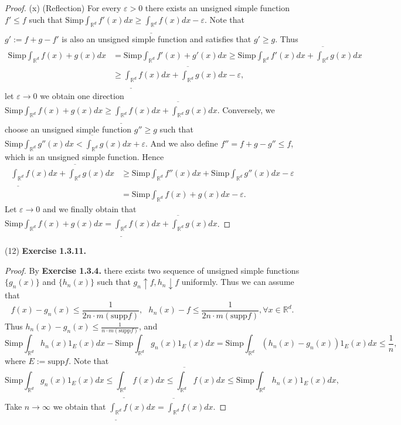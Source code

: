 \documentclass[a4paper]{article}
\begin{document}
\begin{proof}
(x) (Reflection) For every $\varepsilon > 0$ there exists an unsigned simple function $f' \leq f$ such that 
$\mathrm{Simp}\int_{\mathbb{R}^d} f'(x) dx \geq \underline{\int_{\mathbb{R}^d}}f(x) dx - \varepsilon$. Note that 
$g' := f + g -  f'$ is also an unsigned simple function and satisfies that $g' \geq g$. Thus \begin{align*}
\mathrm{Simp}\int_{\mathbb{R}^d} f(x) + g(x) dx &= \mathrm{Simp}\int_{\mathbb{R}^d} f'(x) + g'(x) dx 
\geq \mathrm{Simp}\int_{\mathbb{R}^d} f'(x) dx + \overline{\int_{\mathbb{R}^d}} g(x) dx\\
&\geq \underline{\int_{\mathbb{R}^d}}f(x) dx + \overline{\int_{\mathbb{R}^d}} g(x) dx - \varepsilon,
\end{align*}
let $\varepsilon \to 0$ we obtain one direction $\mathrm{Simp}\int_{\mathbb{R}^d} f(x) + g(x) dx \geq \underline
{\int_{\mathbb{R}^d}}f(x) dx + \overline{\int_{\mathbb{R}^d}} g(x) dx$. Conversely, we choose an unsigned simple
function $g'' \geq g$ such that $\mathrm{Simp}\int_{\mathbb{R}^d} g''(x) dx < \overline{\int_{\mathbb{R}^d}} g(x) dx + \varepsilon$.
And we also define $f'' = f + g - g''  \leq f$, which is an unsigned simple function. Hence \begin{align*}
\underline{\int_{\mathbb{R}^d}}f(x) dx + \overline{\int_{\mathbb{R}^d}} g(x) dx &\geq 
\mathrm{Simp}\int_{\mathbb{R}^d} f''(x) dx + \mathrm{Simp}\int_{\mathbb{R}^d} g''(x) dx - \varepsilon\\
&= \mathrm{Simp}\int_{\mathbb{R}^d} f(x) + g(x) dx - \varepsilon.
\end{align*}
Let $\varepsilon \to 0$ and we finally obtain that $\mathrm{Simp}\int_{\mathbb{R}^d} f(x) + g(x) dx = 
\underline{\int_{\mathbb{R}^d}}f(x) dx + \overline{\int_{\mathbb{R}^d}} g(x) dx$.
\end{proof}

(12) {\bfseries Exercise 1.3.11.}\begin{proof}
By {\bfseries Exercise 1.3.4.} there exists two sequence of unsigned simple functions $\{g_n(x)\}$ and $\{h_n(x)\}$ such
that $g_n \uparrow f, h_n \downarrow f$ uniformly. Thus we can assume that $$
f(x) - g_n(x) \leq \frac{1}{2n\cdot m(\mathrm{supp}f)},\ \ \ h_n(x) - f \leq \frac{1}{2n\cdot m(\mathrm{supp}f)}, 
\forall x \in \mathbb{R}^d.
$$Thus $h_n(x) - g_n(x) \leq \frac{1}{n \cdot m(\mathrm{supp}f)}$, and $$
\mathrm{Simp}\int_{\mathbb{R}^d}h_n(x)1_{E}(x) dx - \mathrm{Simp}\int_{\mathbb{R}^d} g_n(x)1_{E}(x) dx =
\mathrm{Simp}\int_{\mathbb{R}^d} (h_n(x) - g_n(x))1_E(x) dx \leq \frac{1}{n},
$$where $E := \mathrm{supp}f$. Note that $$
\mathrm{Simp}\int_{\mathbb{R}^d} g_n(x)1_{E}(x) dx \leq \underline{\int_{\mathbb{R}^d}}f(x) dx \leq 
\overline{\int_{\mathbb{R}^d}}f(x) dx \leq \mathrm{Simp}\int_{\mathbb{R}^d} h_n(x)1_{E}(x) dx,
$$Take $n \to \infty$ we obtain that $\underline{\int_{\mathbb{R}^d}}f(x) dx = \overline{\int_{\mathbb{R}^d}}f(x) dx$.
\end{proof}
\end{document}
